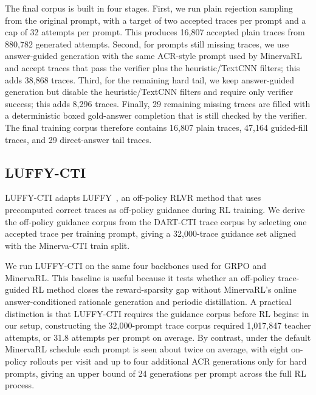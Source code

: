 The final corpus is built in four stages. First, we run plain rejection sampling from the original prompt, with a target of two accepted traces per prompt and a cap of 32 attempts per prompt. This produces 16{,}807 accepted plain traces from 880{,}782 generated attempts. Second, for prompts still missing traces, we use answer-guided generation with the same ACR-style prompt used by MinervaRL and accept traces that pass the verifier plus the heuristic/TextCNN filters; this adds 38{,}868 traces. Third, for the remaining hard tail, we keep answer-guided generation but disable the heuristic/TextCNN filters and require only verifier success; this adds 8{,}296 traces. Finally, 29 remaining missing traces are filled with a deterministic boxed gold-answer completion that is still checked by the verifier. The final training corpus therefore contains 16{,}807 plain traces, 47{,}164 guided-fill traces, and 29 direct-answer tail traces.

\subsection{LUFFY-CTI}
\label{app:luffy-cti}

LUFFY-CTI adapts LUFFY~\citep{yan2025luffy}, an off-policy RLVR method that uses precomputed correct traces as off-policy guidance during RL training. We derive the off-policy guidance corpus from the DART-CTI trace corpus by selecting one accepted trace per training prompt, giving a 32{,}000-trace guidance set aligned with the Minerva-CTI train split.

We run LUFFY-CTI on the same four backbones used for GRPO and MinervaRL. This baseline is useful because it tests whether an off-policy trace-guided RL method closes the reward-sparsity gap without MinervaRL's online answer-conditioned rationale generation and periodic distillation. A practical distinction is that LUFFY-CTI requires the guidance corpus before RL begins: in our setup, constructing the 32{,}000-prompt trace corpus required 1{,}017{,}847 teacher attempts, or 31.8 attempts per prompt on average. By contrast, under the default MinervaRL schedule each prompt is seen about twice on average, with eight on-policy rollouts per visit and up to four additional ACR generations only for hard prompts, giving an upper bound of 24 generations per prompt across the full RL process.
